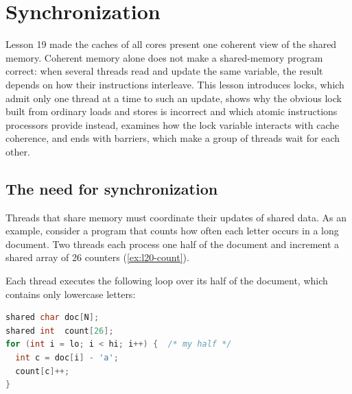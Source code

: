 \documentclass[../main.tex]{subfiles}
\begin{document}
\chapter{Synchronization}

Lesson 19 made the caches of all cores present one coherent view of the
shared memory.  Coherent memory alone does not make a shared-memory program
correct: when several threads read and update the same variable, the result
depends on how their instructions interleave.  This lesson introduces locks,
which admit only one thread at a time to such an update, shows why the
obvious lock built from ordinary loads and stores is incorrect and which
atomic instructions processors provide instead, examines how the lock
variable interacts with cache coherence, and ends with barriers, which make
a group of threads wait for each other.

\section{The need for synchronization}
\label{sec:l20-need}

Threads that share memory must coordinate their updates of shared
data.  As an example, consider a
program that counts how often each letter occurs in a long document.  Two
threads each process one half of the document and increment a shared array
of 26 counters (\cref{ex:l20-count}).

\begin{example}
  \label{ex:l20-count}
  Each thread executes the following loop over its half of the document,
  which contains only lowercase letters:
  \begin{lstlisting}[language=C, numbers=none, morekeywords={shared}]
shared char doc[N];
shared int  count[26];
for (int i = lo; i < hi; i++) {  /* my half */
  int c = doc[i] - 'a';
  count[c]++;
}
\end{lstlisting}
\end{example}
\end{document}
